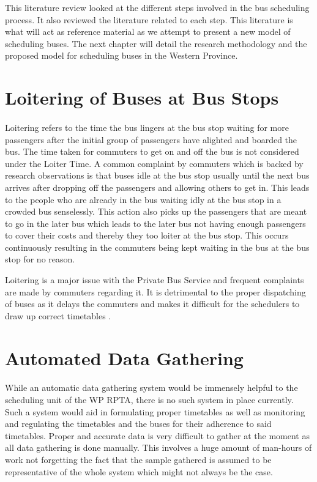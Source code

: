 This literature review looked at the different steps involved in the bus scheduling process. It also reviewed the literature related to each step. This literature is what will act as reference material as we attempt to present a new model of scheduling buses. The next chapter will detail the research methodology and the proposed model for scheduling buses in the Western Province.



\section{Loitering of Buses at Bus Stops}
\label{loitering}

\paragraph{} Loitering refers to the time the bus lingers at the bus stop waiting for more passengers after the initial group of passengers have alighted and boarded the bus. The time taken for commuters to get on and off the bus is not considered under the Loiter Time. A common complaint by commuters which is backed by research observations is that buses idle at the bus stop usually until the next bus arrives after dropping off the passengers and allowing others to get in. This leads to the people who are already in the bus waiting idly at the bus stop in a crowded bus senselessly. This action also picks up the passengers that are meant to go in the later bus which leads to the later bus not having enough passengers to cover their costs and thereby they too loiter at the bus stop. This occurs continuously resulting in the commuters being kept waiting in the bus at the bus stop for no reason. 

Loitering is a major issue with the Private Bus Service and frequent complaints are made by commuters regarding it. It is detrimental to the proper dispatching of buses as it delays the commuters and makes it difficult for the schedulers to draw up correct timetables \cite{Mahesh2013a, Theja2013a, Mahesh2013b, Navaratne2013a, Navaratne2013b}.



\section{Automated Data Gathering}

\paragraph{ } While an automatic data gathering system would be immensely helpful to the scheduling unit of the WP RPTA, there is no such system in place currently. Such a system would aid in formulating proper timetables as well as monitoring and regulating the timetables and the buses for their adherence to said timetables. Proper and accurate data is very difficult to gather at the moment as all data gathering is done manually. This involves a huge amount of man-hours of work not forgetting the fact that the sample gathered is assumed to be representative of the whole system which might not always be the case.



